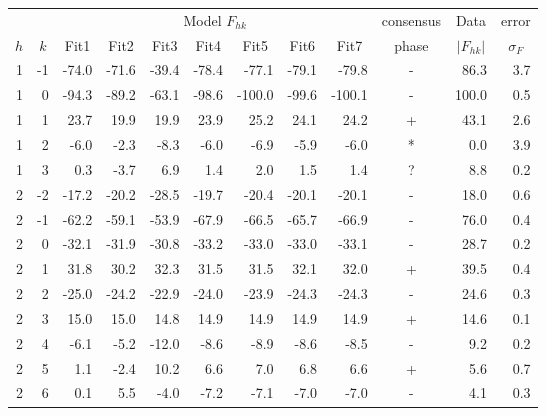 \begin{table}[htbp]
  \centering
\begin{tabular}{rrrrrrrrrcrr}
\hline
& & \multicolumn{7}{c}{Model $F_{hk}$} & consensus & \multicolumn{1}{c}{Data} & \multicolumn{1}{c}{error} \\
\cline{3-9}
\multicolumn{1}{c}{$h$} & \multicolumn{1}{c}{$k$} & \multicolumn{1}{c}{Fit1} & \multicolumn{1}{c}{Fit2} & \multicolumn{1}{c}{Fit3} & \multicolumn{1}{c}{Fit4} & \multicolumn{1}{c}{Fit5} & \multicolumn{1}{c}{Fit6} & \multicolumn{1}{c}{Fit7} & phase & \multicolumn{1}{c}{$\left|F_{hk}\right|$} & \multicolumn{1}{c}{$\sigma_F$} \\ 
\hline
1 & -1 & -74.0 & -71.6 & -39.4 & -78.4 &  -77.1 & -79.1 &  -79.8 & - &  86.3 & 3.7 \\ 
1 &  0 & -94.3 & -89.2 & -63.1 & -98.6 & -100.0 & -99.6 & -100.1 & - & 100.0 & 0.5 \\ 
1 &  1 &  23.7 &  19.9 &  19.9 &  23.9 &   25.2 &  24.1 &   24.2 & + &  43.1 & 2.6 \\ 
1 &  2 &  -6.0 &  -2.3 &  -8.3 &  -6.0 &   -6.9 &  -5.9 &   -6.0 & * &   0.0 & 3.9 \\ 
1 &  3 &   0.3 &  -3.7 &   6.9 &   1.4 &    2.0 &   1.5 &    1.4 & ? &   8.8 & 0.2 \\ 
2 & -2 & -17.2 & -20.2 & -28.5 & -19.7 &  -20.4 & -20.1 &  -20.1 & - &  18.0 & 0.6 \\ 
2 & -1 & -62.2 & -59.1 & -53.9 & -67.9 &  -66.5 & -65.7 &  -66.9 & - &  76.0 & 0.4 \\ 
2 &  0 & -32.1 & -31.9 & -30.8 & -33.2 &  -33.0 & -33.0 &  -33.1 & - &  28.7 & 0.2 \\ 
2 &  1 &  31.8 &  30.2 &  32.3 &  31.5 &   31.5 &  32.1 &   32.0 & + &  39.5 & 0.4 \\ 
2 &  2 & -25.0 & -24.2 & -22.9 & -24.0 &  -23.9 & -24.3 &  -24.3 & - &  24.6 & 0.3 \\ 
2 &  3 &  15.0 &  15.0 &  14.8 &  14.9 &   14.9 &  14.9 &   14.9 & + & 14.6 & 0.1 \\ 
2 &  4 &  -6.1 &  -5.2 & -12.0 &  -8.6 &   -8.9 &  -8.6 &   -8.5 & - & 9.2 & 0.2 \\ 
2 &  5 &   1.1 &  -2.4 &  10.2 &   6.6 &    7.0 &   6.8 &    6.6 & + & 5.6 & 0.7 \\ 
2 &  6 &   0.1 &   5.5 &  -4.0 &  -7.2 &   -7.1 &  -7.0 &   -7.0 & - & 4.1 & 0.3 \\ 

\end{tabular}
\end{table}
